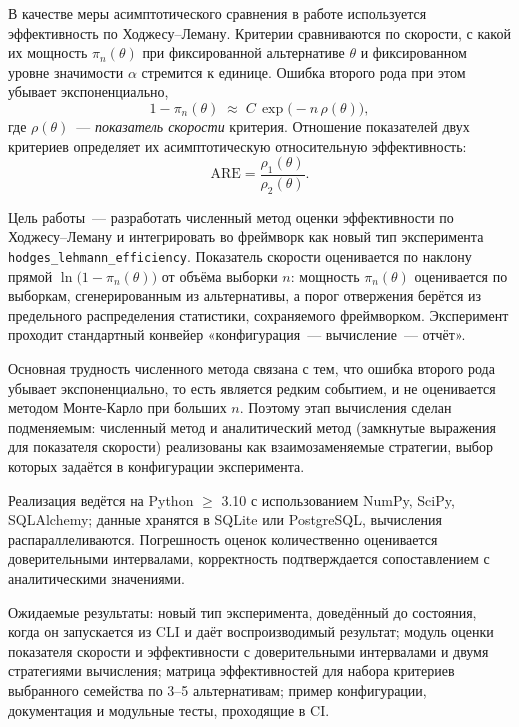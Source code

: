 В качестве меры асимптотического сравнения в работе используется эффективность по
Ходжесу--Леману. Критерии сравниваются по скорости, с какой их мощность
$\pi_n(\theta)$ при фиксированной альтернативе $\theta$ и фиксированном уровне значимости
$\alpha$ стремится к единице. Ошибка второго рода при этом убывает экспоненциально,
\[
    1 - \pi_n(\theta) \;\approx\; C\,\exp\bigl(-n\,\rho(\theta)\bigr),
\]
где $\rho(\theta)$~--- \emph{показатель скорости} критерия. Отношение показателей двух
критериев определяет их асимптотическую относительную эффективность:
\[
    \mathrm{ARE} = \frac{\rho_1(\theta)}{\rho_2(\theta)}.
\]

Цель работы~--- разработать численный метод оценки эффективности по Ходжесу--Леману и
интегрировать во фреймворк как новый тип эксперимента
\texttt{hodges\_\allowbreak{}lehmann\_\allowbreak{}efficiency}. Показатель скорости
оценивается по наклону прямой $\ln\bigl(1 - \pi_n(\theta)\bigr)$ от объёма выборки $n$:
мощность $\pi_n(\theta)$ оценивается по выборкам, сгенерированным из альтернативы, а порог
отвержения берётся из предельного распределения статистики, сохраняемого фреймворком.
Эксперимент проходит стандартный конвейер «конфигурация~--- вычисление~--- отчёт».

Основная трудность численного метода связана с тем, что ошибка второго рода убывает
экспоненциально, то есть является редким событием, и не оценивается методом Монте-Карло
при больших $n$. Поэтому этап вычисления сделан подменяемым: численный метод и
аналитический метод (замкнутые выражения для показателя скорости) реализованы как
взаимозаменяемые стратегии, выбор которых задаётся в конфигурации эксперимента.

Реализация ведётся на Python $\geq$ 3.10 с использованием NumPy, SciPy, SQLAlchemy; данные
хранятся в SQLite или PostgreSQL, вычисления распараллеливаются. Погрешность оценок
количественно оценивается доверительными интервалами, корректность подтверждается
сопоставлением с аналитическими значениями.

Ожидаемые результаты: новый тип эксперимента, доведённый до состояния, когда он запускается
из CLI и даёт воспроизводимый результат; модуль оценки показателя скорости и эффективности с
доверительными интервалами и двумя стратегиями вычисления; матрица эффективностей для набора
критериев выбранного семейства по 3--5 альтернативам; пример конфигурации, документация и
модульные тесты, проходящие в CI.
